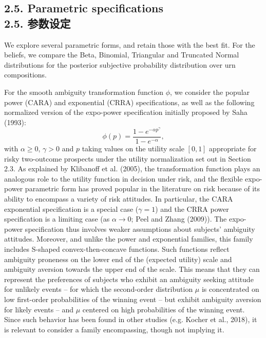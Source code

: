 \documentclass[12pt,a4paper]{article}
\newenvironment{original}
  {\par\vspace{0.5em}\noindent\color{black}\ignorespaces}
  {\par\vspace{0.3em}}
\newcommand{\bilingualsubsection}[2]{%
  \subsection{\texorpdfstring{#1 \\[0.2em] {\normalsize\color{transblue}#2}}{#1}}
}
\begin{document}
\bilingualsubsection{2.5. Parametric specifications}{2.5. 参数设定}

\begin{original}
We explore several parametric forms, and retain those with the best fit. For the beliefs, we compare the Beta, Binomial, Triangular and Truncated Normal distributions for the posterior subjective probability distribution over urn compositions.

For the smooth ambiguity transformation function $\phi$, we consider the popular power (CARA) and exponential (CRRA) specifications, as well as the following normalized version of the expo-power specification initially proposed by Saha (1993):
\begin{equation}
\phi(p) = \frac{1 - e^{-\alpha p^\gamma}}{1 - e^{-\alpha}}, \label{eq:expopower}
\end{equation}
with $\alpha \geq 0$, $\gamma > 0$ and $p$ taking values on the utility scale $[0, 1]$ appropriate for risky two-outcome prospects under the utility normalization set out in Section 2.3. As explained by Klibanoff et al. (2005), the transformation function plays an analogous role to the utility function in decision under risk, and the flexible expo-power parametric form has proved popular in the literature on risk because of its ability to encompass a variety of risk attitudes. In particular, the CARA exponential specification is a special case ($\gamma = 1$) and the CRRA power specification is a limiting case (as $\alpha \to 0$; Peel and Zhang (2009)). The expo-power specification thus involves weaker assumptions about subjects' ambiguity attitudes. Moreover, and unlike the power and exponential families, this family includes S-shaped convex-then-concave functions. Such functions reflect ambiguity proneness on the lower end of the (expected utility) scale and ambiguity aversion towards the upper end of the scale. This means that they can represent the preferences of subjects who exhibit an ambiguity seeking attitude for unlikely events -- for which the second-order distribution $\mu$ is concentrated on low first-order probabilities of the winning event -- but exhibit ambiguity aversion for likely events -- and $\mu$ centered on high probabilities of the winning event. Since such behavior has been found in other studies (e.g. Kocher et al., 2018), it is relevant to consider a family encompassing, though not implying it.
\end{original}
\end{document}

